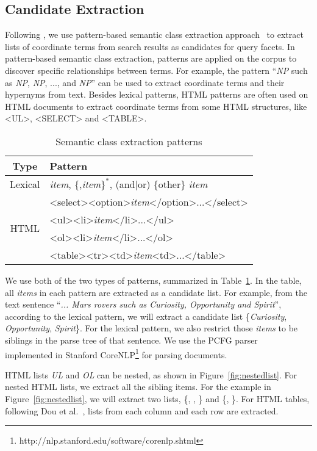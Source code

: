 \subsection{Candidate Extraction} 
\label{sec:extractCandidateLists}
Following \citet{dou2011finding}, we use pattern-based semantic class extraction approach~\cite{shi2010corpus} to extract lists of coordinate terms from search results as candidates for query facets.
In pattern-based semantic class extraction, patterns are applied on the corpus to discover specific relationships between terms.
For example, the pattern ``\textit{NP} such as \textit{NP}, \textit{NP}, ..., and \textit{NP}'' can be used to extract coordinate terms and their hypernyms from text.
Besides lexical patterns, HTML patterns are often used on HTML documents to extract coordinate terms from some HTML structures, like <UL>, <SELECT> and <TABLE>.
\begin{table}[ht!]
\centering
\caption{Semantic class extraction patterns}
\label{tab:patterns}
\begin{tabular}{|c|l|} \hline
Type& Pattern\\ \hline
Lexical & \textit{item}, \{,\textit{item}$\}^*$, (and|or) \{other\} \textit{item} \\  \hline
\multirow{4}{*}{HTML}
& <select><option>\textit{item}</option>...</select>\\\cline{2-2}
& <ul><li>\textit{item}</li>...</ul>\\\cline{2-2}
& <ol><li>\textit{item}</li>...</ol>\\\cline{2-2}
& <table><tr><td>\textit{item}<td>...</table>\\ \hline
\end{tabular}
\end{table}

We use both of the two types of patterns, summarized in Table~\ref{tab:patterns}.
In the table, all \textit{items} in each pattern are extracted as a candidate list.
For example, from the text sentence ``\textit{... Mars rovers such as Curiosity, Opportunity and Spirit}'', 
according to the lexical pattern, we will extract a candidate list \{\textit{Curiosity}, \textit{Opportunity}, \textit{Spirit}\}.
For the lexical pattern, we also restrict those \textit{items} to be siblings in the parse tree of that sentence.
We use the PCFG parser~\cite{klein2003accurate}
implemented in Stanford CoreNLP\footnote{http://nlp.stanford.edu/software/corenlp.shtml} for parsing documents.

HTML lists \textit{UL} and \textit{OL} can be nested, as shown in Figure~\ref{fig:nestedlist}. For nested HTML lists, we extract all the sibling items. For the example in Figure~\ref{fig:nestedlist}, we will extract two lists,
\{, , \} and \{, \}.
For HTML tables, following Dou et al.~\cite{dou2011finding}, lists from each column and each row are extracted.

